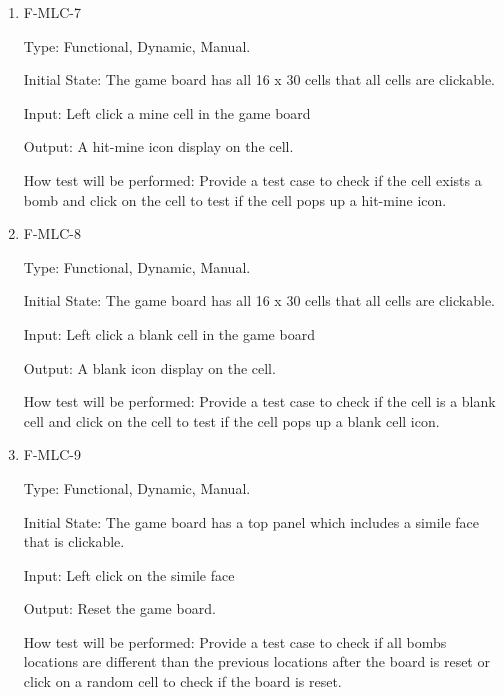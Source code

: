 \documentclass[12pt, titlepage]{article}
\begin{document}
\begin{enumerate}
\item{F-MLC-7\\}

Type: Functional, Dynamic, Manual.
					
Initial State: The game board has all 16 x 30 cells that all cells are clickable.
					
Input: Left click a mine cell in the game board
					
Output: A hit-mine icon display on the cell.
					
How test will be performed: Provide a test case to check if the cell exists a bomb and click on the cell to test if the cell pops up a hit-mine icon.

\item{F-MLC-8\\}

Type: Functional, Dynamic, Manual.
					
Initial State: The game board has all 16 x 30 cells that all cells are clickable.
					
Input: Left click a blank cell in the game board
					
Output: A blank icon display on the cell.
					
How test will be performed: Provide a test case to check if the cell is a blank cell and click on the cell to test if the cell pops up a blank cell icon.

\item{F-MLC-9\\}

Type: Functional, Dynamic, Manual.
					
Initial State: The game board has a top panel which includes a simile face that is clickable.
					
Input: Left click on the simile face
					
Output: Reset the game board.
					
How test will be performed: Provide a test case to check if all bombs locations are different than the previous locations after the board is reset or click on a random cell to check if the board is reset.

\end{enumerate}
\end{document}

